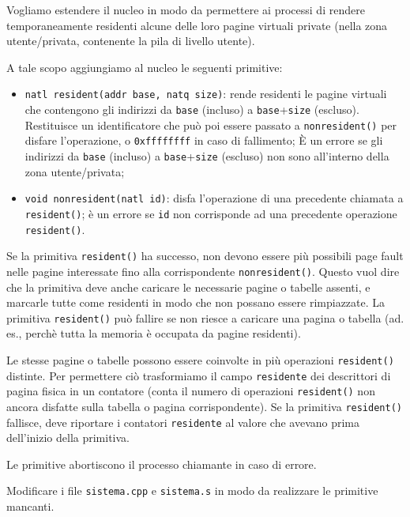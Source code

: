 Vogliamo estendere il nucleo in modo da permettere ai processi di rendere
temporaneamente residenti alcune delle loro pagine virtuali private
(nella zona utente/privata, contenente la pila di livello utente).

A tale scopo aggiungiamo al nucleo le seguenti primitive:
\begin{itemize}
  \item \verb|natl resident(addr base, natq size)|: rende residenti le pagine
 	virtuali che contengono gli indirizzi da \verb|base| (incluso) a
	\verb|base|+\verb|size| (escluso). Restituisce un identificatore che pu\`o poi
	essere passato a \verb|nonresident()| per disfare l'operazione,
	o \verb|0xffffffff| in caso di fallimento; \`E un errore
	se gli indirizzi da \verb|base| (incluso) a \verb|base|+\verb|size|
	(escluso) non sono all'interno della zona utente/privata;
  \item \verb|void nonresident(natl id)|: disfa l'operazione di una precedente
  	chiamata a \verb|resident()|; \`e un errore se \verb|id| non
	corrisponde ad una precedente operazione \verb|resident()|.
\end{itemize}
Se la primitiva \verb|resident()| ha successo, non devono essere pi\`u
possibili page fault nelle pagine interessate fino alla corrispondente
\verb|nonresident()|. Questo vuol dire che la primitiva deve anche
caricare le necessarie pagine o tabelle assenti, e marcarle tutte come
residenti in modo che non possano essere rimpiazzate.
La primitiva \verb|resident()| pu\`o fallire se non riesce a caricare
una pagina o tabella (ad. es., perch\`e tutta la memoria \`e occupata
da pagine residenti).

Le stesse pagine o tabelle possono essere coinvolte in pi\`u operazioni
\verb|resident()| distinte. Per permettere ci\`o trasformiamo
il campo \verb|residente| dei descrittori di pagina fisica in un contatore
(conta il numero di operazioni \verb|resident()| non ancora disfatte 
sulla tabella o pagina corrispondente). Se la primitiva \verb|resident()|
fallisce, deve riportare i contatori \verb|residente| al valore che
avevano prima dell'inizio della primitiva.

Le primitive abortiscono il processo chiamante in caso di errore.

Modificare i file \verb|sistema.cpp| e \verb|sistema.s| in modo da realizzare le primitive mancanti.

